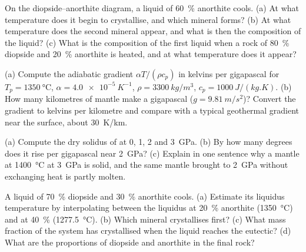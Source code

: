 \begin{exercise}[$\star$]\label{exo:b2:mantle-melting:2}
On the diopside--anorthite diagram, a liquid of \qty{60}{\percent} anorthite
cools. (a) At what temperature does it begin to crystallise, and which mineral
forms? (b) At what temperature does the second mineral appear, and what is then
the composition of the liquid? (c) What is the composition of the first liquid when
a rock of \qty{80}{\percent} diopside and \qty{20}{\percent} anorthite is heated,
and at what temperature does it appear?
\end{exercise}

\begin{exercise}[$\star$]\label{exo:b2:mantle-melting:3}
(a) Compute the adiabatic gradient $\alpha T/(\rho c_p)$ in kelvins per gigapascal
for $T_p = \qty{1350}{\celsius}$, $\alpha = \qty{4.0e-5}{K^{-1}}$, $\rho =
\qty{3300}{kg/m^3}$, $c_p = \qty{1000}{J/(kg.K)}$. (b) How many kilometres of
mantle make a gigapascal ($g = \qty{9.81}{m/s^2}$)? Convert the gradient to kelvins
per kilometre and compare with a typical geothermal gradient near the surface,
about \qty{30}{K/km}.
\end{exercise}

\begin{exercise}[$\star$]\label{exo:b2:mantle-melting:4}
(a) Compute the dry solidus of  at 0, 1, 2 and \qty{3}{GPa}. (b) By how
many degrees does it rise per gigapascal near \qty{2}{GPa}? (c) Explain in one
sentence why a mantle at \qty{1400}{\celsius} at \qty{3}{GPa} is solid, and the
same mantle brought to \qty{2}{GPa} without exchanging heat is partly molten.
\end{exercise}

\begin{exercise}[$\star\star$]\label{exo:b2:mantle-melting:5}
A liquid of \qty{70}{\percent} diopside and \qty{30}{\percent} anorthite cools.
(a) Estimate its liquidus temperature by interpolating between the liquidus at
\qty{20}{\percent} anorthite (\qty{1350}{\celsius}) and at \qty{40}{\percent}
(\qty{1277.5}{\celsius}). (b) Which mineral crystallises first? (c) What mass
fraction of the system has crystallised when the liquid reaches the eutectic?
(d) What are the proportions of diopside and anorthite in the final rock?
\end{exercise}

